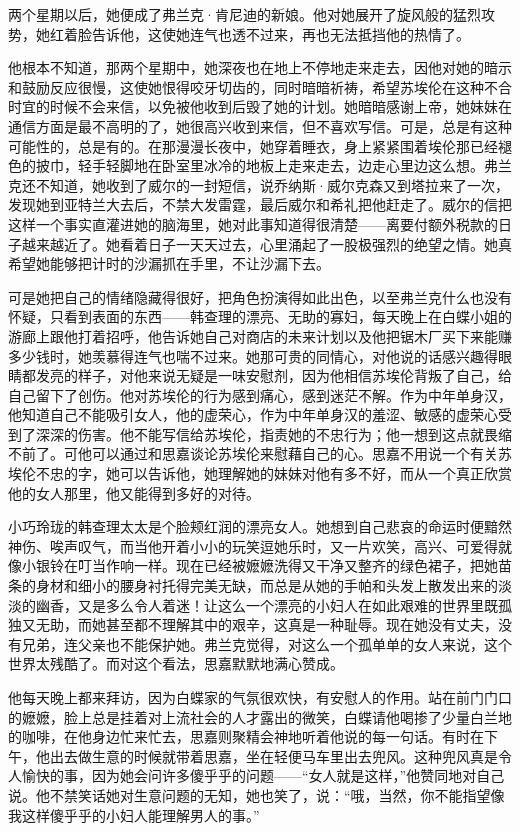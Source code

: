 \par 两个星期以后，她便成了弗兰克·肯尼迪的新娘。他对她展开了旋风般的猛烈攻势，她红着脸告诉他，这使她连气也透不过来，再也无法抵挡他的热情了。
\par 他根本不知道，那两个星期中，她深夜也在地上不停地走来走去，因他对她的暗示和鼓励反应很慢，这使她恨得咬牙切齿的，同时暗暗祈祷，希望苏埃伦在这种不合时宜的时候不会来信，以免被他收到后毁了她的计划。她暗暗感谢上帝，她妹妹在通信方面是最不高明的了，她很高兴收到来信，但不喜欢写信。可是，总是有这种可能性的，总是有的。在那漫漫长夜中，她穿着睡衣，身上紧紧围着埃伦那已经褪色的披巾，轻手轻脚地在卧室里冰冷的地板上走来走去，边走心里边这么想。弗兰克还不知道，她收到了威尔的一封短信，说乔纳斯·威尔克森又到塔拉来了一次，发现她到亚特兰大去后，不禁大发雷霆，最后威尔和希礼把他赶走了。威尔的信把这样一个事实直灌进她的脑海里，她对此事知道得很清楚——离要付额外税款的日子越来越近了。她看着日子一天天过去，心里涌起了一股极强烈的绝望之情。她真希望她能够把计时的沙漏抓在手里，不让沙漏下去。
\par 可是她把自己的情绪隐藏得很好，把角色扮演得如此出色，以至弗兰克什么也没有怀疑，只看到表面的东西——韩查理的漂亮、无助的寡妇，每天晚上在白蝶小姐的游廊上跟他打着招呼，他告诉她自己对商店的未来计划以及他把锯木厂买下来能赚多少钱时，她羡慕得连气也喘不过来。她那可贵的同情心，对他说的话感兴趣得眼睛都发亮的样子，对他来说无疑是一味安慰剂，因为他相信苏埃伦背叛了自己，给自己留下了创伤。他对苏埃伦的行为感到痛心，感到迷茫不解。作为中年单身汉，他知道自己不能吸引女人，他的虚荣心，作为中年单身汉的羞涩、敏感的虚荣心受到了深深的伤害。他不能写信给苏埃伦，指责她的不忠行为；他一想到这点就畏缩不前了。可他可以通过和思嘉谈论苏埃伦来慰藉自己的心。思嘉不用说一个有关苏埃伦不忠的字，她可以告诉他，她理解她的妹妹对他有多不好，而从一个真正欣赏他的女人那里，他又能得到多好的对待。
\par 小巧玲珑的韩查理太太是个脸颊红润的漂亮女人。她想到自己悲哀的命运时便黯然神伤、唉声叹气，而当他开着小小的玩笑逗她乐时，又一片欢笑，高兴、可爱得就像小银铃在叮当作响一样。现在已经被嬷嬷洗得又干净又整齐的绿色裙子，把她苗条的身材和细小的腰身衬托得完美无缺，而总是从她的手帕和头发上散发出来的淡淡的幽香，又是多么令人着迷！让这么一个漂亮的小妇人在如此艰难的世界里既孤独又无助，而她甚至都不理解其中的艰辛，这真是一种耻辱。现在她没有丈夫，没有兄弟，连父亲也不能保护她。弗兰克觉得，对这么一个孤单单的女人来说，这个世界太残酷了。而对这个看法，思嘉默默地满心赞成。
\par 他每天晚上都来拜访，因为白蝶家的气氛很欢快，有安慰人的作用。站在前门门口的嬷嬷，脸上总是挂着对上流社会的人才露出的微笑，白蝶请他喝掺了少量白兰地的咖啡，在他身边忙来忙去，思嘉则聚精会神地听着他说的每一句话。有时在下午，他出去做生意的时候就带着思嘉，坐在轻便马车里出去兜风。这种兜风真是令人愉快的事，因为她会问许多傻乎乎的问题——“女人就是这样，”他赞同地对自己说。他不禁笑话她对生意问题的无知，她也笑了，说：“哦，当然，你不能指望像我这样傻乎乎的小妇人能理解男人的事。”
